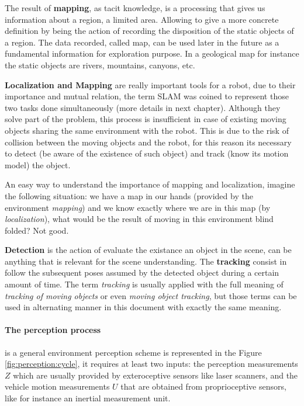 The result of \textbf{mapping}, as tacit knowledge, is a processing that gives us information about a region, a limited area. Allowing to give a more concrete definition by being the action of recording the disposition of the static objects of a region. The data recorded, called map, can be used later in the future as a fundamental information for exploration purpose. In a geological map for instance the static objects are rivers, mountains, canyons, etc. 

\textbf{Localization and Mapping} are really important tools for a robot, due to their importance and mutual relation, the term SLAM was coined to represent those two tasks done simultaneously (more details in next chapter). Although they solve part of the problem, this process is insufficient in case of existing moving objects sharing the same environment with the robot. This is due to the risk of collision between the moving objects and the robot, for this reason its necessary to detect (be aware of the existence of such object) and track (know its motion model) the object.

An easy way to understand the importance of mapping and localization, imagine the following situation: we have a map in our hands (provided by the environment \textit{mapping}) and we know exactly where we are in this map (by \textit{localization}), what would be the result of moving in this environment blind folded? Not good.

\textbf{Detection} is the action of evaluate the existance an object in the scene, can be anything that is relevant for the scene understanding. The \textbf{tracking} consist in follow the subsequent poses assumed by the detected object during a certain amount of time. The term \textit{tracking} is usually applied with the full meaning of \textit{tracking of moving objects}\cite{Wang04a} or even \textit{moving object tracking}, but those terms can be used in alternating manner in this document with exactly the same meaning.

\paragraph{The perception process} is a general environment perception scheme is represented in the Figure \ref{fig:perception:cycle}, it requires at least two inputs: the perception measurements $Z$ which are usually provided by exteroceptive sensors like laser scanners, and the vehicle motion measurements $U$ that are obtained from proprioceptive sensors, like for instance an inertial measurement unit.

